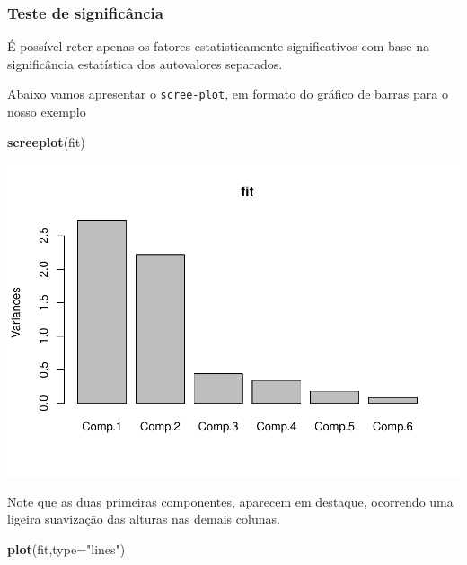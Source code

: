 \documentclass[12pt,brazil,]{book}
\newenvironment{Shaded}{\begin{snugshade}}{\end{snugshade}}
\newcommand{\DataTypeTok}[1]{\textcolor[rgb]{0.13,0.29,0.53}{#1}}
\newcommand{\KeywordTok}[1]{\textcolor[rgb]{0.13,0.29,0.53}{\textbf{#1}}}
\newcommand{\NormalTok}[1]{#1}
\newcommand{\StringTok}[1]{\textcolor[rgb]{0.31,0.60,0.02}{#1}}
\begin{document}
\hypertarget{teste-de-significancia}{%
\subsubsection{Teste de significância}\label{teste-de-significancia}}

É possível reter apenas os fatores estatisticamente significativos com
base na significância estatística dos autovalores separados.

Abaixo vamos apresentar o \texttt{scree-plot}, em formato do gráfico de
barras para o nosso exemplo

\begin{Shaded}
\begin{Highlighting}[]
\KeywordTok{screeplot}\NormalTok{(fit)}
\end{Highlighting}
\end{Shaded}

\includegraphics{03-AnaliseFat_files/figure-latex/unnamed-chunk-7-1.pdf}

Note que as duas primeiras componentes, aparecem em destaque, ocorrendo
uma ligeira suavização das alturas nas demais colunas.

\begin{Shaded}
\begin{Highlighting}[]
\KeywordTok{plot}\NormalTok{(fit,}\DataTypeTok{type=}\StringTok{"lines"}\NormalTok{)}
\end{Highlighting}
\end{Shaded}
\end{document}
